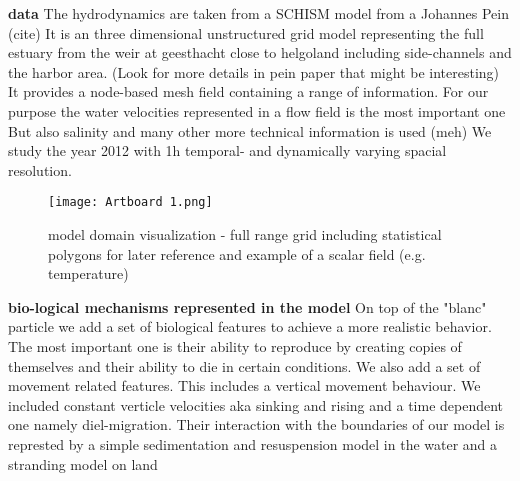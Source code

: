 \textbf{data}
The hydrodynamics are taken from a SCHISM model from a Johannes Pein (cite) 
It is an three dimensional unstructured  grid model representing the full estuary from the weir at geesthacht close to helgoland including side-channels and the harbor area.
(Look for more details in pein paper that might be interesting)
It provides a node-based mesh field containing a range of information.
For our purpose the water velocities represented in a flow field is the most important one
But also salinity and many other more technical information is used (meh)
We study the year 2012 with 1h temporal- and dynamically varying spacial resolution.

\begin{figure}
    \texttt{[image: Artboard 1.png]}
    \caption{model domain visualization - full range grid including statistical polygons for later reference and example of a scalar field (e.g. temperature)}
    \label{fig:statistial polygons}
\end{figure}

\textbf{bio-logical mechanisms represented in the model}
On top of the "blanc" particle we add a set of biological features to achieve a more realistic behavior.
The most important one is their ability to reproduce by creating copies of themselves and their ability to die in certain conditions.
We also add a set of movement related features. This includes a vertical movement behaviour. We included constant verticle velocities aka sinking and rising and a time dependent one namely diel-migration.
Their interaction with the boundaries of our model is represted by a simple sedimentation and resuspension model in the water and a stranding model on land





